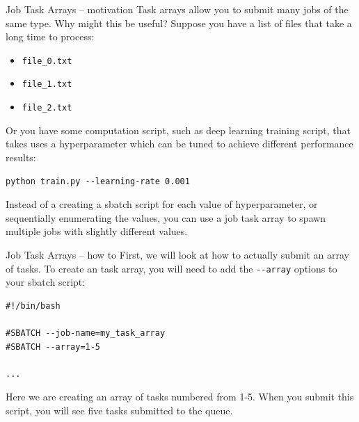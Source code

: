 \documentclass[10pt]{beamer}
\begin{document}
\begin{frame}[label={sec:org7a6ad13},fragile]{Job Task Arrays -- motivation}
 Task arrays allow you to submit many jobs of the same type. Why might this be
useful? Suppose you have a list of files that take a long time to process:

\begin{itemize}
\item \texttt{file\_0.txt}
\item \texttt{file\_1.txt}
\item \texttt{file\_2.txt}
\end{itemize}

Or you have some computation script, such as deep learning training script, that
takes uses a hyperparameter which can be tuned to achieve different performance
results:

\begin{verbatim}
python train.py --learning-rate 0.001
\end{verbatim}

Instead of a creating a sbatch script for each value of hyperparameter, or
sequentially enumerating the values, you can use a job task array to spawn
multiple jobs with slightly different values.
\end{frame}

\begin{frame}[label={sec:org2b28bf9},fragile]{Job Task Arrays -- how to}
 First, we will look at how to actually submit an array of tasks. To create an
task array, you will need to add the \texttt{-{}-array} options to your sbatch script:

\begin{verbatim}
#!/bin/bash

#SBATCH --job-name=my_task_array
#SBATCH --array=1-5

...
\end{verbatim}

Here we are creating an array of tasks numbered from 1-5. When you submit this
script, you will see five tasks submitted to the queue.
\end{frame}
\end{document}
